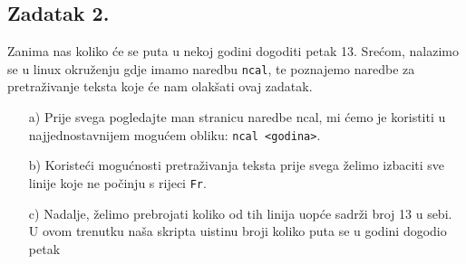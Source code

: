 \documentclass{exam}
\newcommand{\shell}[1]{\texttt{#1}}
\begin{document}
                                \subsection*{Zadatak 2.}
                                    Zanima nas koliko će se puta u nekoj godini
                                    dogoditi petak 13. Srećom, nalazimo se u
                                    linux okruženju gdje imamo naredbu
                                    \shell{ncal}, te poznajemo naredbe za
                                    pretraživanje teksta koje će nam olakšati
                                    ovaj zadatak. 
                                        \begin{itemize}
                                                \item[a)] Prije svega pogledajte
                                                man stranicu naredbe ncal, mi
                                                ćemo je koristiti u
                                                najjednostavnijem mogućem
                                                obliku: \shell{ncal <godina>}.
                                                        \item[b)] Koristeći
                                                        mogućnosti pretraživanja
                                                        teksta prije svega
                                                        želimo izbaciti sve
                                                        linije koje ne počinju s
                                                        rijeci \shell{Fr}.
                                                                \item[c)]
                                                                Nadalje, želimo
                                                                prebrojati
                                                                koliko od tih
                                                                linija uopće
                                                                sadrži broj 13 u
                                                                sebi. U ovom
                                                                trenutku naša
                                                                skripta uistinu
                                                                broji koliko
                                                                puta se u godini
                                                                dogodio petak

\end{itemize}
\end{document}
